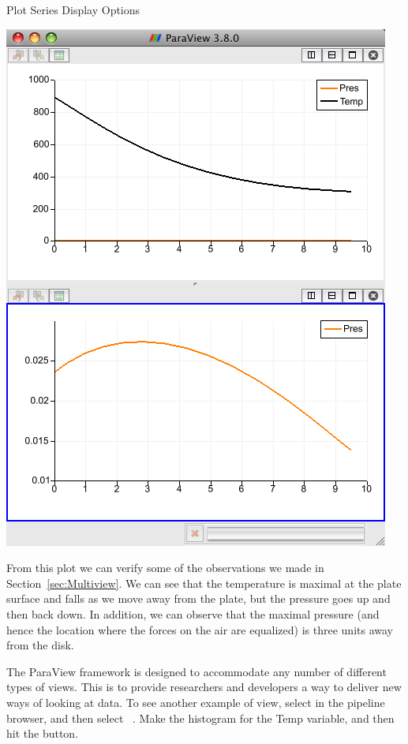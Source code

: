 \begin{exercise}{Plot Series Display Options}
  \begin{inlinefig}
    \includegraphics[width=.5\scw]{images/LinePlot4}
  \end{inlinefig}

  From this plot we can verify some of the observations we made in
  Section~\ref{sec:Multiview}.  We can see that the temperature is maximal
  at the plate surface and falls as we move away from the plate, but the
  pressure goes up and then back down.  In addition, we can observe that
  the maximal pressure (and hence the location where the forces on the air
  are equalized) is three units away from the disk.
\end{exercise}

The ParaView framework is designed to accommodate any number of different
types of views.  This is to provide researchers and developers a way to
deliver new ways of looking at data.  To see another example of view,
select  in the pipeline browser, and then select
 \ra {} \ra
{}~.  Make the histogram
for the Temp variable, and then hit the \apply button.

